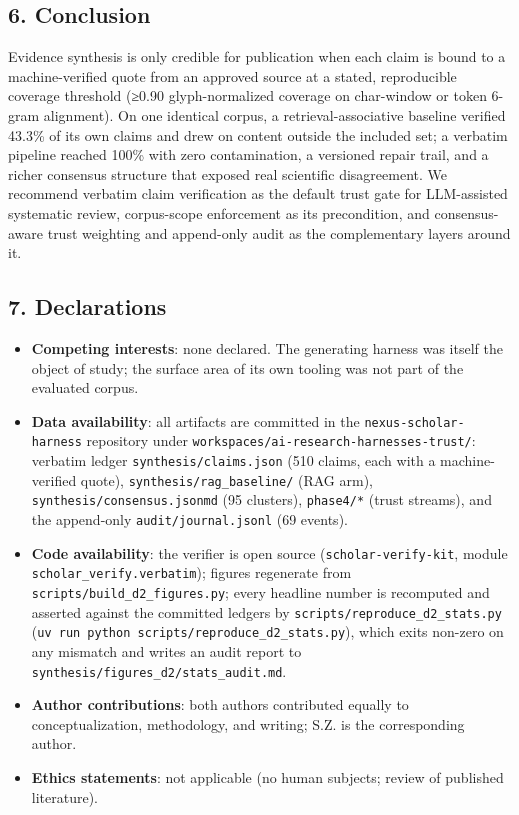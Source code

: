 \documentclass[11pt]{article}
\newcounter{none} %
\providecommand{\tightlist}{%
  \setlength{\itemsep}{0pt}\setlength{\parskip}{0pt}}
\begin{document}
\subsection{6. Conclusion}\label{conclusion}

Evidence synthesis is only credible for publication when each claim is
bound to a machine-verified quote from an approved source at a stated,
reproducible coverage threshold (≥0.90 glyph-normalized coverage on
char-window or token 6-gram alignment). On one identical corpus, a
retrieval-associative baseline verified 43.3\% of its own claims and
drew on content outside the included set; a verbatim pipeline reached
100\% with zero contamination, a versioned repair trail, and a richer
consensus structure that exposed real scientific disagreement. We
recommend verbatim claim verification as the default trust gate for
LLM-assisted systematic review, corpus-scope enforcement as its
precondition, and consensus-aware trust weighting and append-only audit
as the complementary layers around it.

\subsection{7. Declarations}\label{declarations}

\begin{itemize}
\tightlist
\item
  \textbf{Competing interests}: none declared. The generating harness
  was itself the object of study; the surface area of its own tooling
  was not part of the evaluated corpus.
\item
  \textbf{Data availability}: all artifacts are committed in the
  \texttt{nexus-scholar-harness} repository under
  \texttt{workspaces/ai-research-harnesses-trust/}: verbatim ledger
  \texttt{synthesis/claims.json} (510 claims, each with a
  machine-verified quote), \texttt{synthesis/rag\_baseline/} (RAG arm),
  \texttt{synthesis/consensus.json\textbar{}md} (95 clusters),
  \texttt{phase4/*} (trust streams), and the append-only
  \texttt{audit/journal.jsonl} (69 events).
\item
  \textbf{Code availability}: the verifier is open source
  (\texttt{scholar-verify-kit}, module
  \texttt{scholar\_verify.verbatim}); figures regenerate from
  \texttt{scripts/build\_d2\_figures.py}; every headline number is
  recomputed and asserted against the committed ledgers by
  \texttt{scripts/reproduce\_d2\_stats.py}
  (\texttt{uv\ run\ python\ scripts/reproduce\_d2\_stats.py}), which
  exits non-zero on any mismatch and writes an audit report to
  \texttt{synthesis/figures\_d2/stats\_audit.md}.
\item
  \textbf{Author contributions}: both authors contributed equally to
  conceptualization, methodology, and writing; S.Z. is the corresponding
  author.
\item
  \textbf{Ethics statements}: not applicable (no human subjects; review
  of published literature).
\end{itemize}
\end{document}
